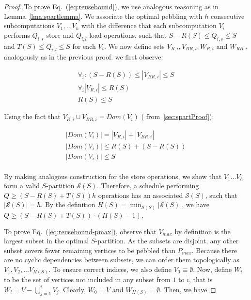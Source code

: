 \begin{proof}
	To prove Eq.~(\ref{eq:reusebound}), we use analogous 
	reasoning as in Lemma~\ref{lma:spartlemma}. We associate 
	the optimal pebbling with $h$ consecutive subcomputations 
	$V_1, \dots V_h$ with the difference that each 
	subcomputation $V_i$ performs $Q_{i,s}$ store and $Q_{i,l}$ load 
	operations, such that $S-R(S) \le Q_{i,s} \le S$ and $T(S) \le Q_{i,l} \le 
	S$ for each $V_i$. We now define sets $V_{R,i}, V_{BR,i}, W_{R,i}$ and 
	$W_{RB,i}$ analogously as in the previous proof. we first observe:
	
	\vspace{-0.5em}
	\begin{gather}
	\nonumber
	\forall_{i}: (S - R(S)) \le |V_{BR,i}| \le S \\
	\nonumber
	\forall_{i}|V_{R,i}| \le R(S) \\
	\nonumber
	R(S) \le S 
	\end{gather}
	\vspace{-0.5em}
	
	Using the fact that $V_{R,i} \cup V_{BR,i} = Dom(V_i)$ 
	( from~\cref{sec:spartProof}):
	
	\vspace{-0.5em}
	\begin{gather}
	\label{eq:proof}
	\nonumber
	|Dom(V_i)| = |V_{R,i}| + |V_{BR,i}| \\
	\nonumber
	|Dom(V_i)| \le R(S) + (S - R(S)) \\
	\nonumber
	|Dom(V_i)| \le S \\
	\end{gather}
	\vspace{-0.5em}
	
	By making analogous construction for the store 
	operations, we show that $V_1 \dots V_h$ form a valid 
	$S$-partition $\mathcal{S}(S)$. Therefore, a schedule 
	performing $Q \ge (S - R(S) + T(S)) h$ operations has an 
	associated $\mathcal{S}(S)$, such that $|\mathcal{S}(S)| 
	= h$. By the definition $H(S) = 
	\min_{\mathcal{S}(S)}|\mathcal{S}(S)|$, we have $Q \ge (S 
	- R(S) + T(S)) \cdot (H(S) - 1)$.
	
	
	To prove Eq.~(\ref{eq:reusebound-pmax}), observe that $V_{max}$ by 
	definition
	is the largest subset in the optimal $S$-partition. As the subsets are
	disjoint, any other subset covers fewer remaining vertices to be pebbled 
	than
	$P_{max}$. Because there are no cyclic dependencies between subsets, we can
	order them topologically as $V_1, V_2, ...V_{H(S)}$. To ensure correct 
	indices,
	we also define $V_0 \equiv \emptyset$. Now, define $W_i$ to be the set
	of vertices not included in any subset from $1$ to $i$, that is $W_i = V -
	\bigcup_{j=1}^{i} V_j$. Clearly, $W_0 = V$ and $W_{H(S)} = \emptyset$. 
	Then, we
	have
	

\end{proof}
